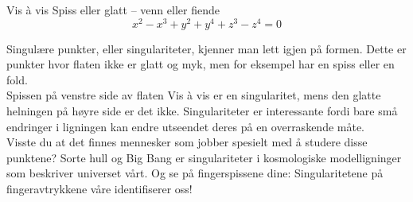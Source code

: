 \begin{surferPage}{Vis \`a vis}
Spiss eller glatt – venn eller fiende\\
\smallskip
\[x^2	- x^3+ y^2+ y^4+ z^3- z^4	=  0\]

\vspace{0.3cm}
Singulære punkter, eller singulariteter, kjenner man lett igjen på formen. Dette er punkter hvor flaten ikke er glatt og myk, men for eksempel har en spiss eller en fold.\\
\vspace{0.3cm}
Spissen på venstre side av flaten Vis \`a vis er en singularitet, mens den glatte helningen på høyre side er det ikke. Singulariteter er interessante fordi bare små endringer i ligningen kan endre utseendet deres på en overraskende måte.\\

\vspace{0.3cm}
Visste du at det finnes mennesker som jobber spesielt med å studere disse punktene? Sorte hull og Big Bang er singulariteter i kosmologiske modelligninger som beskriver universet vårt. Og se på fingerspissene dine: Singularitetene på fingeravtrykkene våre identifiserer oss!
\end{surferPage}
